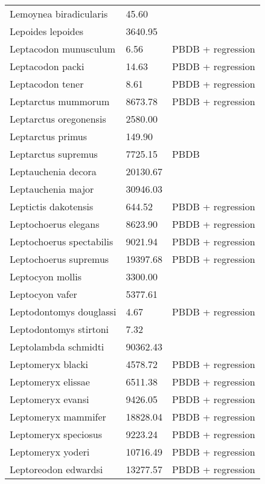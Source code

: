 \documentclass{article}
\begin{document}
\begin{center}
\begin{longtable}{p{} p{} p{}}
    Lemoynea biradicularis & 45.60 & \cite{Tomiya2013} \\ 
    Lepoides lepoides & 3640.95 & \cite{Tomiya2013} \\ 
    Leptacodon munusculum & 6.56 & PBDB + regression \\ 
    Leptacodon packi & 14.63 & PBDB + regression \\ 
    Leptacodon tener & 8.61 & PBDB + regression \\ 
    Leptarctus mummorum & 8673.78 & PBDB + regression \\ 
    Leptarctus oregonensis & 2580.00 & \cite{McKenna2011} \\ 
    Leptarctus primus & 149.90 & \cite{Tomiya2013} \\ 
    Leptarctus supremus & 7725.15 & PBDB \\ 
    Leptauchenia decora & 20130.67 & \cite{Tomiya2013} \\ 
    Leptauchenia major & 30946.03 & \cite{Tomiya2013} \\ 
    Leptictis dakotensis & 644.52 & PBDB + regression \\ 
    Leptochoerus elegans & 8623.90 & PBDB + regression \\ 
    Leptochoerus spectabilis & 9021.94 & PBDB + regression \\ 
    Leptochoerus supremus & 19397.68 & PBDB + regression \\ 
    Leptocyon mollis & 3300.00 & \cite{McKenna2011} \\ 
    Leptocyon vafer & 5377.61 & \cite{Tomiya2013} \\ 
    Leptodontomys douglassi & 4.67 & PBDB + regression \\ 
    Leptodontomys stirtoni & 7.32 & \cite{Stock1937} \\ 
    Leptolambda schmidti & 90362.43 & \cite{Zack2005} \\ 
    Leptomeryx blacki & 4578.72 & PBDB + regression \\ 
    Leptomeryx elissae & 6511.38 & PBDB + regression \\ 
    Leptomeryx evansi & 9426.05 & PBDB + regression \\ 
    Leptomeryx mammifer & 18828.04 & PBDB + regression \\ 
    Leptomeryx speciosus & 9223.24 & PBDB + regression \\ 
    Leptomeryx yoderi & 10716.49 & PBDB + regression \\ 
    Leptoreodon edwardsi & 13277.57 & PBDB + regression \\ 

\end{longtable}
\end{center}
\end{document}
